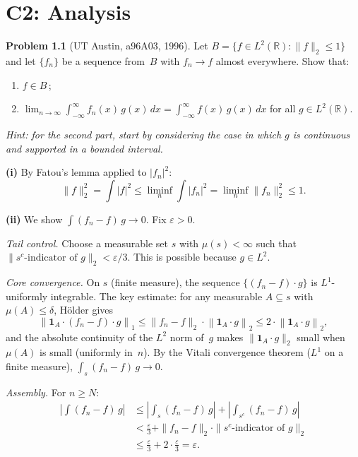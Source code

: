 \documentclass[12pt,oneside]{book}
\theoremstyle{plain}
\theoremstyle{definition}
\newtheorem{problem}{Problem}[chapter]
\theoremstyle{remark}
\begin{document}
\chapter{C2: Analysis}\label{ch:c2}

\begin{problem}[UT Austin, a96A03, 1996]
Let $B = \{f \in L^2(\mathbb{R}) : \|f\|_2 \le 1\}$ and let $\{f_n\}$
be a sequence from~$B$ with $f_n \to f$ almost everywhere. Show that:
\begin{enumerate}[label=(\roman*)]
\item $f \in B$\,;
\item $\displaystyle\lim_{n \to \infty} \int_{-\infty}^{\infty}
  f_n(x)\,g(x)\,dx = \int_{-\infty}^{\infty} f(x)\,g(x)\,dx$
  for all $g \in L^2(\mathbb{R})$.
\end{enumerate}
\emph{Hint: for the second part, start by considering the case in which
$g$ is continuous and supported in a bounded interval.}
\end{problem}

\begin{proofbox}
\textbf{(i)} By Fatou's lemma applied to $|f_n|^2$:
\[
  \|f\|_2^2 = \int |f|^2 \le \liminf_n \int |f_n|^2
  = \liminf_n \|f_n\|_2^2 \le 1.
\]

\textbf{(ii)} We show $\int (f_n - f)\,g \to 0$. Fix $\varepsilon > 0$.

\emph{Tail control.} Choose a measurable set $s$ with $\mu(s) < \infty$
such that $\|s^c\text{-indicator of } g\|_2 < \varepsilon/3$. This is
possible because $g \in L^2$.

\emph{Core convergence.} On $s$ (finite measure), the sequence
$\{(f_n - f) \cdot g\}$ is $L^1$-uniformly integrable. The key
estimate: for any measurable $A \subseteq s$ with $\mu(A) \le \delta$,
H\"older gives
\[
  \left\| \mathbf{1}_A \cdot (f_n - f) \cdot g \right\|_1
  \le \|f_n - f\|_2 \cdot \left\| \mathbf{1}_A \cdot g \right\|_2
  \le 2 \cdot \left\| \mathbf{1}_A \cdot g \right\|_2,
\]
and the absolute continuity of the $L^2$ norm of~$g$ makes
$\|\mathbf{1}_A \cdot g\|_2$ small when $\mu(A)$ is small (uniformly
in~$n$). By the Vitali convergence theorem ($L^1$ on a finite measure),
$\int_s (f_n - f)\,g \to 0$.

\emph{Assembly.} For $n \ge N$:
\begin{align*}
  \left| \int (f_n - f)\,g \right|
  &\le \left| \int_s (f_n - f)\,g \right|
     + \left| \int_{s^c} (f_n - f)\,g \right| \\
  &< \frac{\varepsilon}{3}
     + \|f_n - f\|_2 \cdot \|s^c\text{-indicator of } g\|_2 \\
  &\le \frac{\varepsilon}{3} + 2 \cdot \frac{\varepsilon}{3}
  = \varepsilon.
\end{align*}
\end{proofbox}
\end{document}

